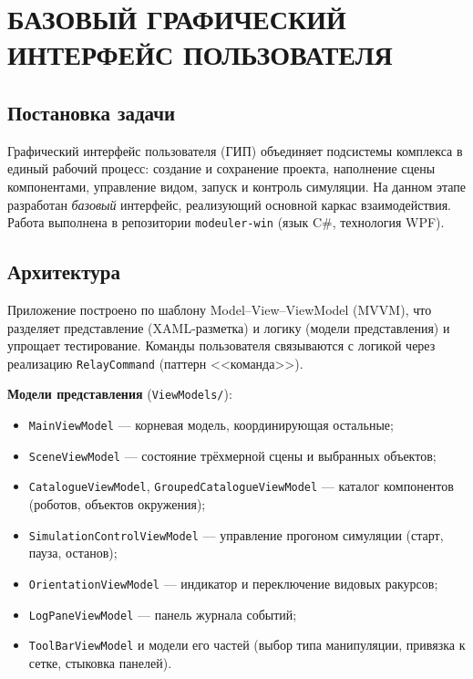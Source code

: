\chapter{БАЗОВЫЙ ГРАФИЧЕСКИЙ ИНТЕРФЕЙС ПОЛЬЗОВАТЕЛЯ}
\label{cha:gui}

\section{Постановка задачи}

Графический интерфейс пользователя (ГИП) объединяет подсистемы комплекса в единый
рабочий процесс: создание и сохранение проекта, наполнение сцены компонентами,
управление видом, запуск и контроль симуляции. На данном этапе разработан
\emph{базовый} интерфейс, реализующий основной каркас взаимодействия. Работа
выполнена в репозитории \texttt{modeuler-win} (язык C\#, технология WPF).

\section{Архитектура}

Приложение построено по шаблону Model--View--ViewModel (MVVM), что разделяет
представление (XAML-разметка) и логику (модели представления) и упрощает
тестирование. Команды пользователя связываются с логикой через реализацию
\texttt{RelayCommand} (паттерн <<команда>>).

\textbf{Модели представления} (\texttt{ViewModels/}):
\begin{itemize}
  \item \texttt{MainViewModel} --- корневая модель, координирующая остальные;
  \item \texttt{SceneViewModel} --- состояние трёхмерной сцены и выбранных
        объектов;
  \item \texttt{CatalogueViewModel}, \texttt{GroupedCatalogueViewModel} ---
        каталог компонентов (роботов, объектов окружения);
  \item \texttt{SimulationControlViewModel} --- управление прогоном симуляции
        (старт, пауза, останов);
  \item \texttt{OrientationViewModel} --- индикатор и переключение видовых
        ракурсов;
  \item \texttt{LogPaneViewModel} --- панель журнала событий;
  \item \texttt{ToolBarViewModel} и модели его частей (выбор типа манипуляции,
        привязка к сетке, стыковка панелей).
\end{itemize}

